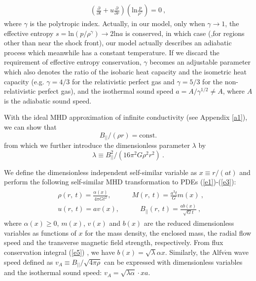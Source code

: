 \documentclass[fleqn,usenatbib]{mnras}
\begin{document}
\begin{gather}
\left(\frac{\partial}{\partial t}+u\frac{\partial}{\partial r}\right)\left(\mathrm{ln}\frac{p}{\rho^{\gamma}}\right)=0\ ,\label{ex1}
\end{gather}
where $\gamma$ is the polytropic index. Actually, in our model, only when $\gamma\rightarrow 1$, the effective entropy $s=\mathrm{ln}\left(p/\rho^{\gamma}\right)\rightarrow 2\mathrm{ln}a$ is conserved, in which case (,for regions other than near the shock front), our model actually describes an adiabatic process which meanwhile has a constant temperature. If we discard the requirement of effective entropy conservation, $\gamma$ becomes an adjustable parameter which also denotes the ratio of the isobaric heat capacity and the isometric heat capacity (e.g. $\gamma=4/3$ for the relativistic perfect gas and $\gamma=5/3$ for the non-relativistic perfect gas), and the isothermal sound speed $a=A/\gamma^{1/2}\neq A$, where $A$ is the adiabatic sound speed.

With the ideal MHD approximation of infinite conductivity (see Appendix \ref{a1}), we can show that \citep{yuLou2006} %
\begin{equation}
B_{||}/(\rho r)=\mathrm{const.}\label{e4}
\end{equation}
from which we further introduce the dimensionless
 parameter $\lambda$ by
\begin{equation}
\lambda\equiv B^{2}_{||}/
  \left(16\pi^{2}G\rho^{2} r^{2}\right)\ .\label{e5}
\end{equation}

We define the dimensionless independent self-similar variable as $x\equiv r/(at)$ and perform the following self-similar MHD transformation to PDEs (\ref{e1})-(\ref{e3}):
\begin{gather}
\begin{split}
&\rho(r,\ t)=\frac{\alpha(x)}{4\pi Gt^{2}},
 \qquad\quad M(r,\ t)=\frac{a^{3}t}{G}m(x)\ ,\\
&u(r,\ t)=av(x), \qquad\quad B_{||}(r,\ t)=\frac{ab(x)}{\sqrt{G}t}\ ,
\end{split}\label{e6}
\end{gather}
where $\alpha(x)\geq 0$, $m(x)$, $v(x)$ and $b(x)$ are the reduced dimensionless variables as functions of $x$ for the mass density, the enclosed mass, the radial flow speed and the transverse magnetic field strength, respectively. From flux conservation integral (\ref{e5}) , we have $b(x)=\sqrt{\lambda}\alpha x$. Similarly, the $\text{Alfv}\mathrm{\acute{e}}\text{n}$ wave speed defined as $v_{A}\equiv B_{||}/\sqrt{4\pi\rho}$ can be expressed with dimensionless variables and the isothermal sound speed: $v_{A}=\sqrt{\lambda\alpha}\cdot xa$.
\end{document}
